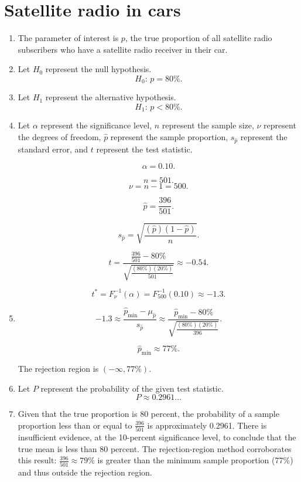 \documentclass[12pt]{article}
\begin{document}
\section{Satellite radio in cars}
\begin{enumerate}
\item The parameter of interest is $p$, the true proportion of all satellite radio subscribers who have a satellite radio receiver in their car.
\item Let $H_0$ represent the null hypothesis.
\[H_0:\,p=80\%.\]
\item Let $H_1$ represent the alternative hypothesis.
\[H_1:\,p<80\%.\]
\item Let $\alpha$ represent the significance level, $n$ represent the sample size, $\nu$ represent the degrees of freedom, $\hat{p}$ represent the sample proportion, $s_{\hat{p}}$ represent the standard error, and $t$ represent the test statistic.

\[\alpha=0.10.\]

\[n=501.\]
\[\nu=n-1=500.\]

\[\hat{p}=\frac{396}{501}.\]

\[s_{\hat{p}}=\sqrt{\frac{(\hat{p})(1-\hat{p})}{n}}.\]

\[t=\frac{\frac{396}{501}-80\%}{\sqrt{\frac{(80\%)(20\%)}{501}}}\approx -0.54.\]

\[t^*=F^{-1}_\nu(\alpha)=F^{-1}_{500}(0.10)\approx -1.3.\]

\item \[-1.3\approx\frac{\hat{p}_{\text{min}}-\mu_{\hat{p}}}{s_{\hat{p}}}\approx\frac{\hat{p}_{\text{min}}-80\%}{\sqrt{\frac{(80\%)(20\%)}{396}}}.\]

\[\hat{p}_{\text{min}}\approx 77\%.\]

The rejection region is $(-\infty,77\%)$.
\item Let $P$ represent the probability of the given test statistic.
\[P\approx 0.2961\dots\]

\item Given that the true proportion is 80 percent, the probability of a sample proportion less than or equal to $\frac{396}{501}$ is approximately 0.2961. There is insufficient evidence, at the 10-percent significance level, to conclude that the true mean is less than 80 percent. The rejection-region method corroborates this result: $\frac{396}{501}\approx79\%$ is greater than the minimum sample proportion (77\%) and thus outside the rejection region.
\end{enumerate}
\end{document}
